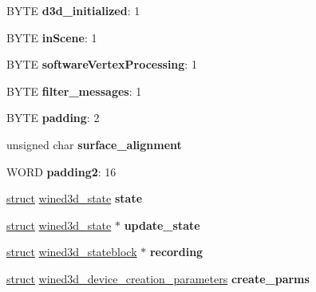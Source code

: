 \begin{DoxyCompactItemize}
B\+Y\+TE {\bfseries d3d\+\_\+initialized}\+: 1
\item 
\mbox{\label{structwined3d__device_a9467193f9b1bd7fb26a1565955009123}} 
B\+Y\+TE {\bfseries in\+Scene}\+: 1
\item 
\mbox{\label{structwined3d__device_a8f1c8b1e3b0b87ba9b0011f6c0eeaf3b}} 
B\+Y\+TE {\bfseries software\+Vertex\+Processing}\+: 1
\item 
\mbox{\label{structwined3d__device_af7821fc75f43339dd8864d2f4d72d8ad}} 
B\+Y\+TE {\bfseries filter\+\_\+messages}\+: 1
\item 
\mbox{\label{structwined3d__device_ab0bfc0d8f03786f85c6c15ff04910b62}} 
B\+Y\+TE {\bfseries padding}\+: 2
\item 
\mbox{\label{structwined3d__device_a2ade52210e0eefa4a46dfef8fa6cd9ea}} 
unsigned char {\bfseries surface\+\_\+alignment}
\item 
\mbox{\label{structwined3d__device_aa02636ca4390f58b0e57ef74494f7cad}} 
W\+O\+RD {\bfseries padding2}\+: 16
\item 
\mbox{\label{structwined3d__device_a4fb1d88e695a2b82a372be50c20c089f}} 
\hyperlink{interfacestruct}{struct} \hyperlink{structwined3d__state}{wined3d\+\_\+state} {\bfseries state}
\item 
\mbox{\label{structwined3d__device_adb60f6c9306a2789d74efb8b85021512}} 
\hyperlink{interfacestruct}{struct} \hyperlink{structwined3d__state}{wined3d\+\_\+state} $\ast$ {\bfseries update\+\_\+state}
\item 
\mbox{\label{structwined3d__device_aaae65da05793731333627f1cb9b923c0}} 
\hyperlink{interfacestruct}{struct} \hyperlink{structwined3d__stateblock}{wined3d\+\_\+stateblock} $\ast$ {\bfseries recording}
\item 
\mbox{\label{structwined3d__device_ac5c5f3d1db1a273e327e4e5ce03c01d8}} 
\hyperlink{interfacestruct}{struct} \hyperlink{structwined3d__device__creation__parameters}{wined3d\+\_\+device\+\_\+creation\+\_\+parameters} {\bfseries create\+\_\+parms}

\end{DoxyCompactItemize}
